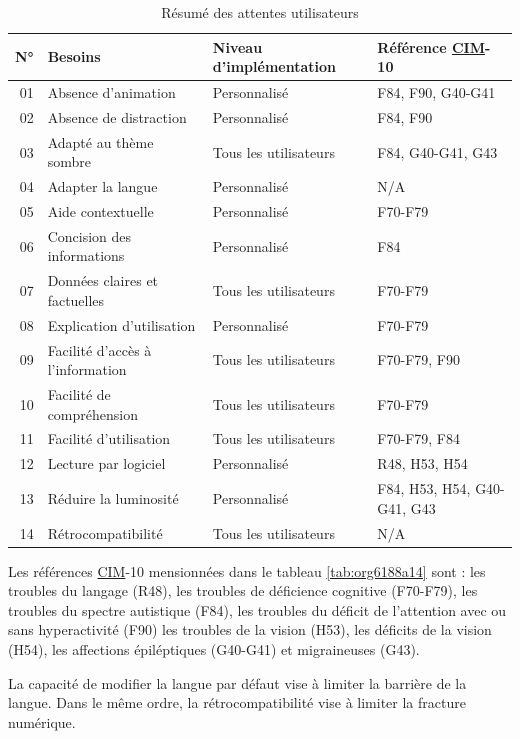 \documentclass[a4paper,12pt]{article}
\begin{document}
\begin{multicols}{2}
\begin{table}[htbp]
\caption{\label{tab:org6188a14}Résumé des attentes utilisateurs}
\centering
\begin{tabular}{rlll}
N° & Besoins & Niveau d'implémentation & Référence \protect\hyperlink{gls-3}{\label{gls-3-use-2}CIM}-10\\
\hline
01 & Absence d'animation & Personnalisé & F84, F90, G40-G41\\
02 & Absence de distraction & Personnalisé & F84, F90\\
03 & Adapté au thème sombre & Tous les utilisateurs & F84, G40-G41, G43\\
04 & Adapter la langue & Personnalisé & N/A\\
05 & Aide contextuelle & Personnalisé & F70-F79\\
06 & Concision des informations & Personnalisé & F84\\
07 & Données claires et factuelles & Tous les utilisateurs & F70-F79\\
08 & Explication d'utilisation & Personnalisé & F70-F79\\
09 & Facilité d'accès à l'information & Tous les utilisateurs & F70-F79, F90\\
10 & Facilité de compréhension & Tous les utilisateurs & F70-F79\\
11 & Facilité d'utilisation & Tous les utilisateurs & F70-F79, F84\\
12 & Lecture par logiciel & Personnalisé & R48, H53, H54\\
13 & Réduire la luminosité & Personnalisé & F84, H53, H54, G40-G41, G43\\
14 & Rétrocompatibilité & Tous les utilisateurs & N/A\\
\end{tabular}
\end{table}

Les références \protect\hyperlink{gls-3}{\label{gls-3-use-3}CIM}-10 mensionnées dans le tableau \ref{tab:org6188a14} sont : les troubles du langage (R48), les troubles de déficience cognitive (F70-F79), les troubles du spectre autistique (F84), les troubles du déficit de l'attention avec ou sans hyperactivité (F90)  les troubles de la vision (H53), les déficits de la vision (H54), les affections épiléptiques (G40-G41) et migraineuses (G43).

La capacité de modifier la langue par défaut vise à limiter la barrière de la langue. Dans le même ordre, la rétrocompatibilité vise à limiter la fracture numérique. 

\end{multicols}
\end{document}
